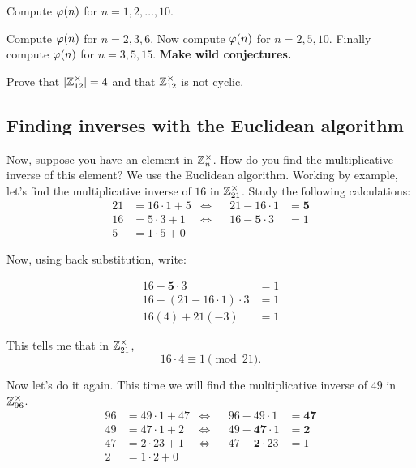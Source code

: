 \documentclass{ximera}
\begin{document}
\begin{exercise}
  Compute $\eulerphi(n)$ for $n = 1,2,\dots, 10$.
\end{exercise}




\begin{exercise}
  Compute $\eulerphi(n)$ for $n = 2,3,6$. Now compute $\eulerphi(n)$
  for $n = 2,5,10$. Finally compute $\eulerphi(n)$ for $n=
  3,5,15$. \textbf{Make wild conjectures.}
\end{exercise}


\begin{exercise}
  Prove that $|\mathbb Z^\times_{12}| = 4$ and that $\mathbb Z^\times_{12}$ is not
  cyclic.
\end{exercise}








\subsection{Finding inverses with the Euclidean algorithm}\label{S:fiea}



Now, suppose you have an element in $\mathbb Z_n^\times$. How do you find the
multiplicative inverse of this element? We use the Euclidean
algorithm. Working by example, let's find
the multiplicative inverse of $16$ in $\mathbb Z_{21}^\times$. Study
the following calculations:
\begin{align*}
  21 &= 16\cdot 1 + 5 &\Leftrightarrow & &                21-16\cdot 1 &= \boldsymbol{5}\\ 
  16 &= 5\cdot 3 + 1 &\Leftrightarrow  & &   16 - \boldsymbol{5}\cdot 3 &= 1\\ 
  5 &= 1 \cdot 5 + 0 &  & & &
\end{align*}

Now, using back substitution, write:

\begin{align*}
16 - \boldsymbol{5}\cdot 3 &= 1 \\
16 - (21-16\cdot 1)\cdot 3 &= 1 \\
16(4) + 21(-3) &= 1
\end{align*}

This tells me that in $\mathbb Z_{21}^\times$,
\[
16\cdot 4 \equiv 1 \pmod{21}.
\]


Now let's do it again. This time we will find the multiplicative
inverse of $49$ in $\mathbb Z_{96}^\times$.
\begin{align*}
  96 &= 49\cdot 1 + 47 &\Leftrightarrow  & &                96 - 49\cdot 1 &= \boldsymbol{47}\\ 
  49 &= 47\cdot 1 + 2  &\Leftrightarrow  & &   49 - \boldsymbol{47}\cdot 1 &= \boldsymbol{2}\\ 
  47 &= 2 \cdot 23 + 1 &\Leftrightarrow  & &   47 - \boldsymbol{2}\cdot 23 &= 1 \\
  2 &= 1\cdot  2+ 0 & & & & 
\end{align*}
\end{document}
